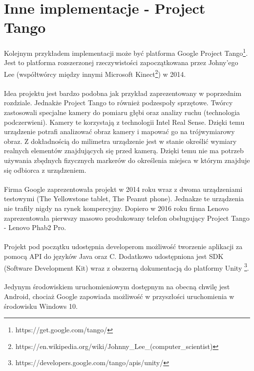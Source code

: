 \newpage
\section{Inne implementacje - Project Tango}
\paragraph{}
Kolejnym przykładem implementacji może być platforma Google Project Tango\footnote{https://get.google.com/tango/}. Jest to platforma rozszerzonej rzeczywistości zapoczątkowana przez Johny'ego Lee (współtwórcy między innymi Microsoft Kinect\footnote{https://en.wikipedia.org/wiki/Johnny\_Lee\_(computer\_scientist)}) w 2014. 
\paragraph{}
Idea projektu jest bardzo podobna jak przykład zaprezentowany w poprzednim rozdziale. Jednakże Project Tango to również podzespoły sprzętowe. Twórcy zastosowali specjalne kamery do pomiaru głębi oraz analizy ruchu (technologia podczerwieni). Kamery te korzystają z technologii Intel Real Sense. Dzięki temu urządzenie potrafi analizować obraz kamery i mapować go na trójwymiarowy obraz. Z dokładnością do milimetra urządzenie jest w stanie określić wymiary realnych elementów znajdujących się przed kamerą. Dzięki temu nie ma potrzeb używania zbędnych fizycznych markerów do określenia miejsca w którym znajduje się odbiorca z urządzeniem.
\paragraph{}
Firma Google zaprezentowała projekt w 2014 roku wraz z dwoma urządzeniami testowymi (The Yellowstone tablet,  The Peanut phone). Jednakze te urządzenia nie trafiły nigdy na rynek kompercyjny. Dopiero w 2016 roku firma Lenovo zaprezentowała pierwszy masowo produkowany telefon obsługujący Project Tango - Lenovo Phab2 Pro.
\paragraph{}
Projekt pod początku udostępnia developerom możliwość tworzenie aplikacji za pomocą API do języków Java oraz C. Dodatkowo udostępniona jest SDK (Software Development Kit) wraz z obszerną dokumentacją do platformy Unity \footnote{https://developers.google.com/tango/apis/unity/}.
\paragraph{}
Jedynym środowiskiem uruchomieniowym dostępnym na obecną chwilę jest Android, chociaż Google zapowiada możliwość w przyszłości uruchomienia w środowisku Windows 10.

